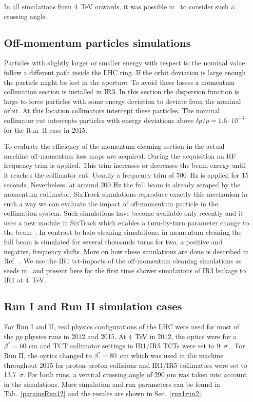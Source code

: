 In all simulations from 4~TeV onwards, it was possible in \fluka~to consider such a crossing angle.

\subsection{Off-momentum particles simulations}
Particles with slightly larger or smaller energy with respect to the nominal value follow a different path inside the LHC ring. If the orbit deviation is large enough the particle might be lost in the aperture. To avoid these losses a momentum collimation section is installed in IR3. In this section the dispersion function is large to force particles with some energy deviation to deviate from the nominal orbit. At this location collimators intercept these particles. The nominal collimator cut intercepts particles with energy deviations above $\delta p/p = 1.6\cdot 10^{-3}$ for the Run~II case in 2015.

To evaluate the efficiency of the momentum cleaning section in the actual machine off-momentum loss maps are acquired. During the acquisition an RF frequency trim is applied. This trim increases or decreases the beam energy until it reaches the collimator cut. Usually a frequency trim of 500~Hz is applied for 15 seconds. Neverheless, at around 200 Hz the full beam is already scraped by the momentum collimator. SixTrack simulations reproduce exactly this mechanism in such a way we can evaluate the impact of off-momentum particle in the collimation system. Such simulations have become available only recently and it uses a new module in SixTrack which enables a turn-by-turn parameter change to the beam~\cite{KyrreIpac2015}. In contrast to halo cleaning simulations, in momentum cleaning the full beam is simulated for several thousands turns for two, a positive and negative, frequency shifts. More on how these simulations are done is described in Ref.~\cite{HectorsPaper}. 
We use the IR1 tct-impacts of the off-momentum cleaning simulations as seeds in \fluka~and present here for the first time shower simulations of IR3 leakage to IR1 at 4~TeV. 

\subsection{Run I and Run II simulation cases}
For Run I and II, real physics configurations of the LHC were used for most of the $pp$ physics runs in 2012 and 2015. At 4~TeV in 2012, the optics were for a $\beta^* = 60$ cm and TCT collimator settings in IR1/IR5 TCTs were set to 9~$\sigma$~\cite{parametersRun1}. For Run II, the optics changed to $\beta^* = 80$~cm which was used in the machine throughout 2015 for proton-proton collisions and IR1/IR5 collimators were set to 13.7~$\sigma$. For both runs, a vertical crossing angle of $290~\mu$m was taken into account in the simulations. More simulation and run parameters can be found in Tab.~\ref{paramsRun12} and the results are shown in Sec.~\ref{run1run2}. 

